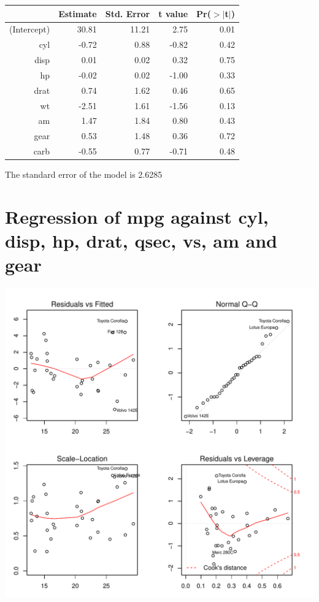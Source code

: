 \documentclass{article}\usepackage[]{graphicx}\usepackage[]{color}
\makeatletter
\def\maxwidth{ %
  \ifdim\Gin@nat@width>\linewidth
    \linewidth
  \else
    \Gin@nat@width
  \fi
}
\newenvironment{knitrout}{}{} %
\makeatother
\begin{document}
\begin{table}[ht]
\centering
\begin{tabular}{rrrrr}
  \hline
 & Estimate & Std. Error & t value & Pr($>$$|$t$|$) \\ 
  \hline
(Intercept) & 30.81 & 11.21 & 2.75 & 0.01 \\ 
  cyl & -0.72 & 0.88 & -0.82 & 0.42 \\ 
  disp & 0.01 & 0.02 & 0.32 & 0.75 \\ 
  hp & -0.02 & 0.02 & -1.00 & 0.33 \\ 
  drat & 0.74 & 1.62 & 0.46 & 0.65 \\ 
  wt & -2.51 & 1.61 & -1.56 & 0.13 \\ 
  am & 1.47 & 1.84 & 0.80 & 0.43 \\ 
  gear & 0.53 & 1.48 & 0.36 & 0.72 \\ 
  carb & -0.55 & 0.77 & -0.71 & 0.48 \\ 
   \hline
\end{tabular}
\end{table}




The standard error of the model is 2.6285

\newpage

\section{Regression of mpg against cyl, disp, hp, drat, qsec, vs, am and gear }
\begin{knitrout}
\color{fgcolor}

{\centering \includegraphics[width=\maxwidth]{figure/lm-cyl-disp-hp-drat-qsec-vs-am-gear} 

}



\end{knitrout}
\end{document}
